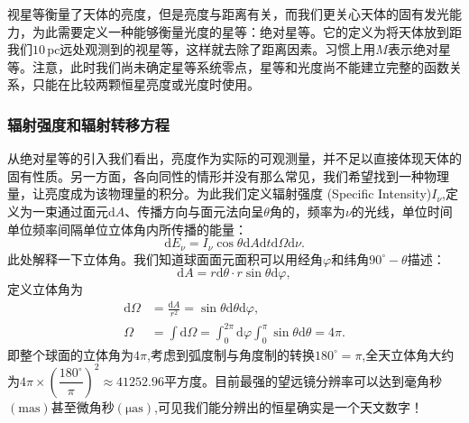 \documentclass[../天体物理基础.tex]{subfiles}
\begin{document}
视星等衡量了天体的亮度，但是亮度与距离有关，而我们更关心天体的固有发光能力，为此需要定义一种能够衡量光度的星等：绝对星等。它的定义为将天体放到距我们$10\,\mathrm{pc}$远处观测到的视星等，这样就去除了距离因素。习惯上用$M$表示绝对星等。注意，此时我们尚未确定星等系统零点，星等和光度尚不能建立完整的函数关系，只能在比较两颗恒星亮度或光度时使用。

\subsubsection{辐射强度和辐射转移方程}
从绝对星等的引入我们看出，亮度作为实际的可观测量，并不足以直接体现天体的固有性质。另一方面，各向同性的情形并没有那么常见，我们希望找到一种物理量，让亮度成为该物理量的积分。为此我们定义辐射强度 (Specific Intensity)$I_{\nu}$,定义为一束通过面元$\mathrm{d}A$、传播方向与面元法向呈$\theta$角的，频率为$\nu$的光线，单位时间单位频率间隔单位立体角内所传播的能量：
\begin{equation}
\mathrm{d}E_{\nu}=I_{\nu}\cos\theta\mathrm{d}A\mathrm{d}t\mathrm{d}\Omega\mathrm{d}\nu.
\end{equation}
此处解释一下立体角。我们知道球面面元面积可以用经角$\varphi$和纬角$90^{\circ}-\theta$描述：
\begin{equation}
\mathrm{d}A=r\mathrm{d}\theta\cdot r\sin\theta\mathrm{d}\varphi,
\end{equation}
定义立体角为
\begin{align}
\mathrm{d}\Omega&=\frac{\mathrm{d}A}{r^{2}}=\sin\theta\mathrm{d}\theta\mathrm{d}\varphi,\\
\Omega&=\int\mathrm{d}\Omega=\int_{0}^{2\pi}\mathrm{d}\varphi\int_{0}^{\pi}\sin\theta\mathrm{d}\theta=4\pi.
\end{align}
即整个球面的立体角为$4\pi$,考虑到弧度制与角度制的转换$180^{\circ}=\pi$,全天立体角大约为$4\pi\times\left(\dfrac{180^{\circ}}{\pi}\right)^{2}\approx41252.96$平方度。目前最强的望远镜分辨率可以达到毫角秒$(\mathrm{mas})$甚至微角秒$(\mathrm{\mu as})$,可见我们能分辨出的恒星确实是一个天文数字！
\end{document}
